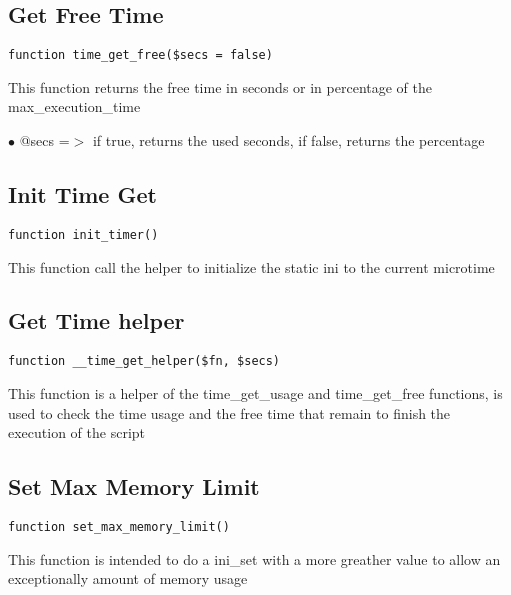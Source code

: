 \documentclass[a4paper]{book}
\begin{document}
\hypertarget{toc205}{}
\subsection{Get Free Time}

\begin{lstlisting}
function time_get_free($secs = false)
\end{lstlisting}

This function returns the free time in seconds or in percentage of the max\_execution\_time

\begin{compactitem}
\item[\color{myblue}$\bullet$] @secs =$>$ if true, returns the used seconds, if false, returns the percentage
\end{compactitem}

\hypertarget{toc206}{}
\subsection{Init Time Get}

\begin{lstlisting}
function init_timer()
\end{lstlisting}

This function call the helper to initialize the static ini to the current microtime

\hypertarget{toc207}{}
\subsection{Get Time helper}

\begin{lstlisting}
function __time_get_helper($fn, $secs)
\end{lstlisting}

This function is a helper of the time\_get\_usage and time\_get\_free functions, is used to
check the time usage and the free time that remain to finish the execution of the script

\hypertarget{toc208}{}
\subsection{Set Max Memory Limit}

\begin{lstlisting}
function set_max_memory_limit()
\end{lstlisting}

This function is intended to do a ini\_set with a more greather value to allow an
exceptionally amount of memory usage
\end{document}
